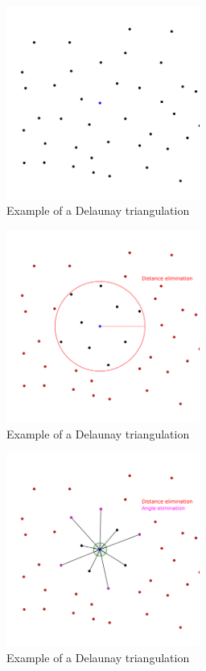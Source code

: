 \documentclass[lettersize,journal,english]{IEEEtran}
\begin{document}
\begin{figure}[!t]
    \centering
    \includegraphics[width=2.5in]{images/illus_crit/points.png}
    \caption{Example of a Delaunay triangulation}
    \label{crit_pts}
\end{figure}

\begin{figure}[!b]
    \centering
    \includegraphics[width=2.5in]{images/illus_crit/distance_elim.png}
    \caption{Example of a Delaunay triangulation}
    \label{crit_dis}
\end{figure}

\begin{figure}[!t]
    \centering
    \includegraphics[width=2.5in]{images/illus_crit/angle_elim.png}
    \caption{Example of a Delaunay triangulation}
    \label{crit_ang}
\end{figure}
\end{document}
